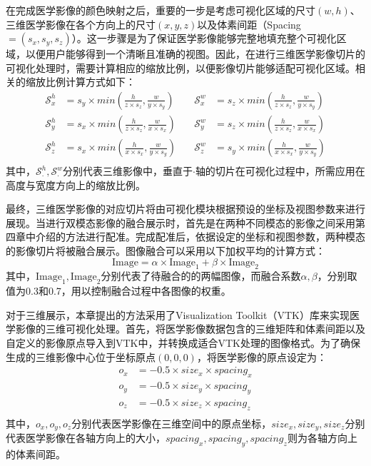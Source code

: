 在完成医学影像的颜色映射之后，重要的一步是考虑可视化区域的尺寸\((w,h)\)、三维医学影像在各个方向上的尺寸\((x,y,z)\)以及体素间距（Spacing\(=(s_x,s_y,s_z)\)）。这一步骤是为了保证医学影像能够完整地填充整个可视化区域，以便用户能够得到一个清晰且准确的视图。因此，在进行三维医学影像切片的可视化处理时，需要计算相应的缩放比例，以便影像切片能够适配可视化区域。相关的缩放比例计算方式如下：
\begin{equation}
    \begin{aligned}
        \mathcal{S}_x^{h} & = s_y \times min(\frac{h}{z \times s_z}, \frac{w}{y \times s_y}) & \quad \mathcal{S}_x^{w} & = s_z \times min(\frac{h}{z \times s_z}, \frac{w}{y \times s_y}) \\
        \mathcal{S}_y^{h} & = s_x \times min(\frac{h}{z \times s_z}, \frac{w}{x \times s_x}) & \quad \mathcal{S}_y^{w} & = s_z \times min(\frac{h}{z \times s_z}, \frac{w}{x \times s_x}) \\
        \mathcal{S}_z^{h} & = s_x \times min(\frac{h}{x \times s_x}, \frac{w}{y \times s_y}) & \quad \mathcal{S}_z^{w} & = s_y \times min(\frac{h}{x \times s_x}, \frac{w}{y \times s_y}) \\
    \end{aligned}
    \label{eq:chap05_scale}
\end{equation}
其中，\(\mathcal{S}_\cdot^{h},\mathcal{S}_\cdot^{w}\)分别代表三维影像中，垂直于\(\cdot\)轴的切片在可视化过程中，所需应用在高度与宽度方向上的缩放比例。

最终，三维医学影像的对应切片将由可视化模块根据预设的坐标及视图参数来进行展现。当进行双模态影像的融合展示时，首先是在两种不同模态的影像之间采用第四章中介绍的方法进行配准。完成配准后，依据设定的坐标和视图参数，两种模态的影像切片将被融合展示。图像融合可以采用以下加权平均的计算方式：
\begin{equation}
    \text{Image} = \alpha \times \text{Image}_1 + \beta \times \text{Image}_2
    \label{eq:chap05_fusion}
\end{equation}
其中，\(\text{Image}_1,\text{Image}_2\)分别代表了待融合的的两幅图像，而融合系数\(\alpha, \beta\)，分别取值为0.3和0.7，用以控制融合过程中各图像的权重。

对于三维展示，本章提出的方法采用了Visualization Toolkit（VTK）库来实现医学影像的三维可视化处理。首先，将医学影像数据包含的三维矩阵和体素间距以及自定义的影像原点导入到VTK中，并转换成适合VTK处理的图像格式。为了确保生成的三维影像中心位于坐标原点\((0,0,0)\)，将医学影像的原点设定为：
\begin{equation}
    \begin{aligned}
        o_x & = -0.5 \times size_x \times spacing_x \\
        o_y & = -0.5 \times size_y \times spacing_y \\
        o_z & = -0.5 \times size_z \times spacing_z \\
    \end{aligned}
\end{equation}
其中，\(o_x,o_y,o_z\)分别代表医学影像在三维空间中的原点坐标，\(size_x,size_y,size_z\)分别代表医学影像在各轴方向上的大小，\(spacing_x,spacing_y,spacing_z\)则为各轴方向上的体素间距。

